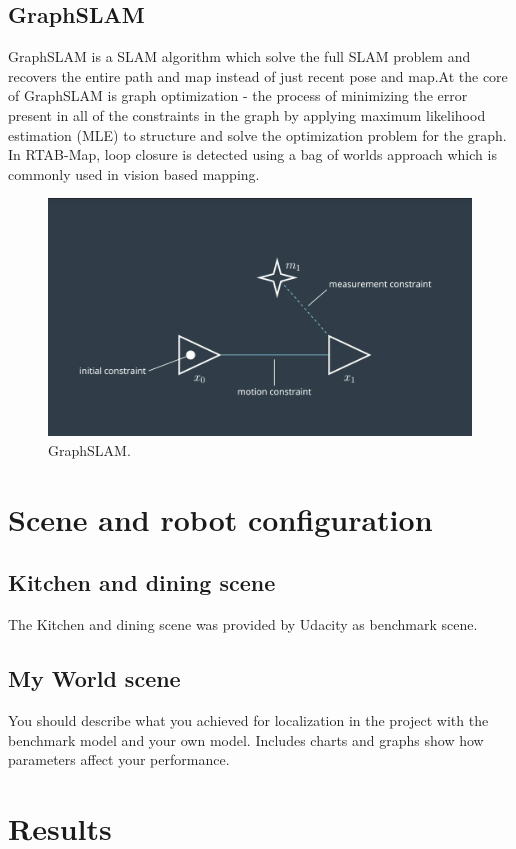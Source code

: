 \documentclass[10pt,journal,compsoc]{IEEEtran}
\begin{document}
\subsection{GraphSLAM}
GraphSLAM is a SLAM algorithm which solve the full SLAM problem and recovers the entire path and map instead of just recent pose and map.At the core of GraphSLAM is graph optimization - the process of minimizing the error present in all of the constraints in the graph by applying maximum likelihood estimation (MLE) to structure and solve the optimization problem for the graph.
In RTAB-Map, loop closure is detected using a bag of worlds approach which is commonly used in vision based mapping.
\begin{figure}[thpb]
      \centering
      \includegraphics[width=\linewidth]{GraphSLAM.png}
      \caption{GraphSLAM.}
      \label{fig:robot1}
\end{figure}
\section{Scene and robot configuration}
\subsection{Kitchen and dining scene}
The Kitchen and dining scene was provided by Udacity as benchmark scene.
\subsection{My World scene}
You should describe what you achieved for localization in the project with the benchmark model and your own model. Includes charts and graphs show how parameters affect your performance. 

\section{Results}
\end{document}
